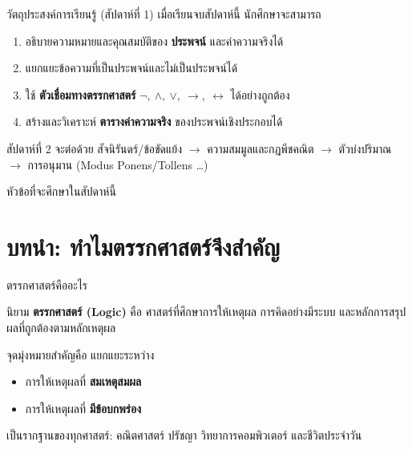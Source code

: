 
\begin{frame}[plain]
  \maketitle
\end{frame}

\begin{frame}{วัตถุประสงค์การเรียนรู้ (สัปดาห์ที่ 1)}
  เมื่อเรียนจบสัปดาห์นี้ นักศึกษาจะสามารถ
  \begin{enumerate}
    \item อธิบายความหมายและคุณสมบัติของ \textbf{ประพจน์} และค่าความจริงได้
    \item แยกแยะข้อความที่เป็นประพจน์และไม่เป็นประพจน์ได้
    \item ใช้ \textbf{ตัวเชื่อมทางตรรกศาสตร์} $\neg,\ \land,\ \lor,\ \rightarrow,\ \leftrightarrow$ ได้อย่างถูกต้อง
    \item สร้างและวิเคราะห์ \textbf{ตารางค่าความจริง} ของประพจน์เชิงประกอบได้
  \end{enumerate}
  \vspace{0.6em}
  \begin{exampleblock}{สัปดาห์ที่ 2 จะต่อด้วย}
    สัจนิรันดร์/ข้อขัดแย้ง $\rightarrow$ ความสมมูลและกฎพีชคณิต $\rightarrow$ ตัวบ่งปริมาณ
    $\rightarrow$ การอนุมาน (Modus Ponens/Tollens \ldots)
  \end{exampleblock}
\end{frame}

\begin{frame}{หัวข้อที่จะศึกษาในสัปดาห์นี้}
  \tableofcontents
\end{frame}


\section{บทนำ: ทำไมตรรกศาสตร์จึงสำคัญ}

\begin{frame}{ตรรกศาสตร์คืออะไร}
  \begin{block}{นิยาม}
    \textbf{ตรรกศาสตร์ (Logic)} คือ ศาสตร์ที่ศึกษาการให้เหตุผล การคิดอย่างมีระบบ
    และหลักการสรุปผลที่ถูกต้องตามหลักเหตุผล
  \end{block}
  \vspace{0.5em}
  จุดมุ่งหมายสำคัญคือ แยกแยะระหว่าง
  \begin{itemize}
    \item การให้เหตุผลที่ \textbf{\textcolor{Tgreen}{สมเหตุสมผล}} 
    \item การให้เหตุผลที่ \textbf{\textcolor{Fred}{มีข้อบกพร่อง}} 
  \end{itemize}
  \vspace{0.5em}
  เป็นรากฐานของทุกศาสตร์: คณิตศาสตร์ ปรัชญา วิทยาการคอมพิวเตอร์ และชีวิตประจำวัน
\end{frame}

